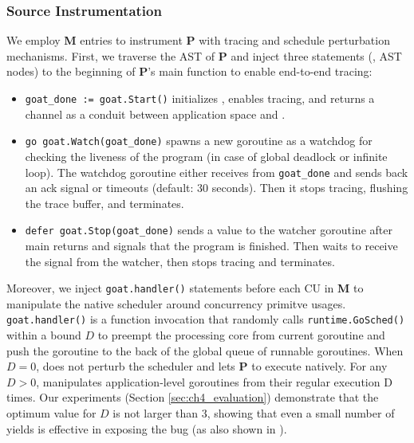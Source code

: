 \subsubsection{Source Instrumentation}

We employ \textbf{M} entries to instrument \textbf{P} with tracing and schedule perturbation mechanisms.
%
First, we traverse the AST of \textbf{P} and inject three statements (\ie, AST nodes) to the beginning of \textbf{P}'s main function to enable end-to-end tracing:
\begin{itemize}
  \item \texttt{goat\_done := goat.Start()} initializes \goat, enables tracing, and returns a channel as a conduit between application space and \goat.
  \item \texttt{go goat.Watch(goat\_done)} spawns a new goroutine as a watchdog for checking the liveness of the program (in case of global deadlock or infinite loop). The watchdog goroutine either receives from \texttt{goat\_done} and sends back an ack signal or timeouts (default: 30 seconds). Then it stops tracing, flushing the trace buffer, and terminates.
  \item \texttt{defer goat.Stop(goat\_done)} sends a value to the watcher goroutine after main returns and signals that the program is finished. Then \goat waits to receive the signal from the watcher, then stops tracing and terminates.
\end{itemize}

Moreover, we inject \texttt{goat.handler()} statements before each CU in \textbf{M} to manipulate the native scheduler around concurrency primitve usages. \texttt{goat.handler()} is a function invocation that randomly calls \texttt{runtime.GoSched()} within a bound $D$ to preempt the processing core from current goroutine and push the goroutine to the back of the global queue of runnable goroutines.
%
When $D=0$, \goat does not perturb the scheduler and lets \textbf{P} to execute natively. For any $D>0$, \goat manipulates application-level goroutines from their regular execution D times.
%
Our experiments (Section \ref{sec:ch4_evaluation}) demonstrate that the optimum value for $D$ is not larger than 3, showing that even a small number of yields is effective in exposing the bug (as also shown in \cite{burckhardt-depthBug-asplos10}).

